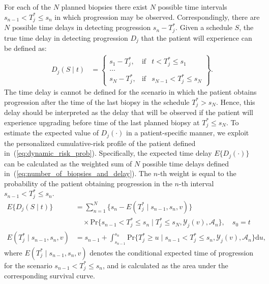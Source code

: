For each of the $N$ planned biopsies there exist $N$ possible time intervals ${s_{n-1} < T^*_j \leq s_n}$ in which progression may be observed. Correspondingly, there are $N$ possible time delays in detecting progression $s_n - T^*_j$. Given a schedule $S$, the true time delay in detecting progression $D_j$ that the patient will experience can be defined as:
\begin{equation}
\label{eq:number_of_biopsies_and_delay}
\begin{split}
D_j (S \mid t) &= \left\{ \begin{array}{lcrr}
  s_1 - T^*_j, &\mbox{if}& t < T^*_j \leq s_1\\
  \ldots \\
  s_N - T^*_j, &\mbox{if}& s_{N-1} < T^*_j \leq s_N  
\end{array} \right\}.
\end{split}
\end{equation}
The time delay is cannot be defined for the scenario in which the patient obtains progression after the time of the last biopsy in the schedule $T^*_j > s_N$. Hence, this delay should be interpreted as the delay that will be observed if the patient will experience upgrading before time of the last planned biopsy at $T^*_j\leq s_N$. To estimate the expected value of $D_j(\cdot)$ in a patient-specific manner, we exploit the personalized cumulative-risk profile of the patient defined in~(\ref{eq:dynamic_risk_prob}). Specifically, the expected time delay $E\{D_j(\cdot)\}$ can be calculated as the weighted sum of $N$ possible time delays defined in~(\ref{eq:number_of_biopsies_and_delay}). The $n$-th weight is equal to the probability of the patient obtaining progression in the $n$-th interval ${s_{n-1} < T^*_j \leq s_n}$.
\begin{equation*}
\label{eq:expected_number_of_biopsies_and_delay}
\begin{split}
E\big\{D_j(S \mid t)\big\} &= \sum_{n=1}^{N} \Big\{s_n - E(T^*_j \mid s_{n-1}, s_n, v)\Big\} \\ & \quad \times \mbox{Pr}\Big\{s_{n-1} < T^*_j \leq s_n \mid T^*_j \leq s_N, \mathcal{Y}_j(v), \mathcal{A}_n\Big\}, \quad s_0 = t\\
E(T^*_j \mid s_{n-1}, s_n, v) &= s_{n-1} + \int_{s_{n-1}}^{s_n} \mbox{Pr}\Big\{T^*_j \geq u \mid s_{n-1} < T^*_j \leq s_n, \mathcal{Y}_{j}(v), \mathcal{A}_n\Big\} \mathrm{d}u,
\end{split}
\end{equation*}
where $E(T^*_j \mid s_{n-1}, s_n, v)$ denotes the conditional expected time of progression for the scenario $s_{n-1} < T^*_j \leq s_n$, and is calculated as the area under the corresponding survival curve.


